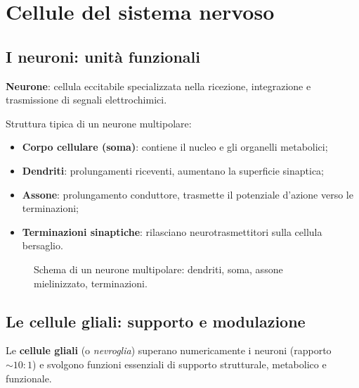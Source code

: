 \documentclass[11pt,a4paper,italian,twoside]{report}
\theoremstyle{definition} %
\begin{document}
\section{Cellule del sistema nervoso}
\label{sec:cellule_sn}

\subsection{I neuroni: unità funzionali}
\label{subsec:neuroni}

\begin{definizione}
\textbf{Neurone}: cellula eccitabile specializzata nella ricezione, integrazione e trasmissione di segnali elettrochimici.
\end{definizione}

Struttura tipica di un neurone multipolare:
\begin{itemize}
  \item \textbf{Corpo cellulare (soma)}: contiene il nucleo e gli organelli metabolici;
  \item \textbf{Dendriti}: prolungamenti riceventi, aumentano la superficie sinaptica;
  \item \textbf{Assone}: prolungamento conduttore, trasmette il potenziale d'azione verso le terminazioni;
  \item \textbf{Terminazioni sinaptiche}: rilasciano neurotrasmettitori sulla cellula bersaglio.
\end{itemize}

\begin{figure}[htbp]
  \centering
  \caption{Schema di un neurone multipolare: dendriti, soma, assone mielinizzato, terminazioni.}
  \label{fig:neurone_struttura}
\end{figure}

\subsection{Le cellule gliali: supporto e modulazione}
\label{subsec:glia}

\begin{concetto}
Le \textbf{cellule gliali} (o \textit{nevroglia}) superano numericamente i neuroni (rapporto $\sim 10:1$) e svolgono funzioni essenziali di supporto strutturale, metabolico e funzionale.
\end{concetto}
\end{document}
